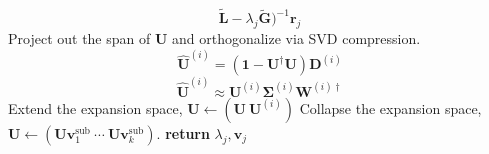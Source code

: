 \begin{algorithm}
\begin{algorithmic}[1]
\[                    \tilde{\mathbf{L}}
                    -
                    \lambda_j
                    \tilde{\mathbf{G}}
                )^{-1}
                \mathbf{r}_j
            \]
            \State
            Project out the span of \(\mathbf{U}\) and orthogonalize via
            SVD compression.
            \[
                \widehat{\mathbf{U}}^{(i)}
                =
                (\mathbf{1} - \mathbf{U}^\dagger \mathbf{U})
                \mathbf{D}^{(i)}
            \]
            \[
                \widehat{\mathbf{U}}^{(i)}
                \approx
                \mathbf{U}^{(i)}
                \mathbf{\Sigma}^{(i)}
                \mathbf{W}^{(i)\dagger}
            \]
                \State
                Extend the expansion space,
                \(
                    \mathbf{U}
                    \leftarrow
                    (\mathbf{U}\ \mathbf{U}^{(i)})
                \)
            \Else
                \State
                Collapse the expansion space,
                \(
                    \mathbf{U}
                    \leftarrow
                    (
                        \mathbf{U}
                        \mathbf{v}_1^\mathrm{sub}\ 
                        \cdots\ 
                        \mathbf{U}
                        \mathbf{v}_k^\mathrm{sub}
                    )
                \).
            \EndIf
        \EndFor
        \State
        {\bfseries return}
        \(
            \lambda_j,
            \mathbf{v}_j
        \)
        \EndProcedure
    \end{algorithmic}
\end{algorithm}


